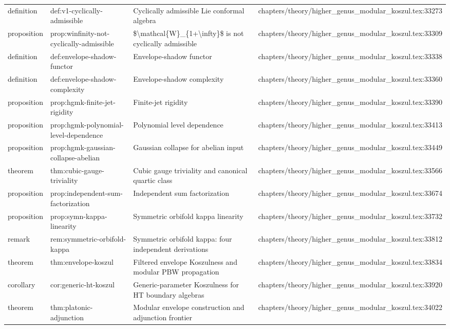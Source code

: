 \documentclass[11pt]{article}
\begin{document}
\begin{longtable}{L{0.10\textwidth}L{0.26\textwidth}L{0.42\textwidth}L{0.22\textwidth}}
definition & def:v1-cyclically-admissible & Cyclically admissible Lie conformal algebra & chapters/theory/higher\_genus\_modular\_koszul.tex:33273\\
proposition & prop:winfinity-not-cyclically-admissible & \$\textbackslash{}mathcal\{W\}\_\{1+\textbackslash{}infty\}\$ is not cyclically admissible & chapters/theory/higher\_genus\_modular\_koszul.tex:33309\\
definition & def:envelope-shadow-functor & Envelope-shadow functor & chapters/theory/higher\_genus\_modular\_koszul.tex:33338\\
definition & def:envelope-shadow-complexity & Envelope-shadow complexity & chapters/theory/higher\_genus\_modular\_koszul.tex:33360\\
proposition & prop:hgmk-finite-jet-rigidity & Finite-jet rigidity & chapters/theory/higher\_genus\_modular\_koszul.tex:33390\\
proposition & prop:hgmk-polynomial-level-dependence & Polynomial level dependence & chapters/theory/higher\_genus\_modular\_koszul.tex:33413\\
proposition & prop:hgmk-gaussian-collapse-abelian & Gaussian collapse for abelian input & chapters/theory/higher\_genus\_modular\_koszul.tex:33449\\
theorem & thm:cubic-gauge-triviality & Cubic gauge triviality and canonical quartic class & chapters/theory/higher\_genus\_modular\_koszul.tex:33566\\
proposition & prop:independent-sum-factorization & Independent sum factorization & chapters/theory/higher\_genus\_modular\_koszul.tex:33674\\
proposition & prop:symn-kappa-linearity & Symmetric orbifold kappa linearity & chapters/theory/higher\_genus\_modular\_koszul.tex:33732\\
remark & rem:symmetric-orbifold-kappa & Symmetric orbifold kappa: four independent derivations & chapters/theory/higher\_genus\_modular\_koszul.tex:33812\\
theorem & thm:envelope-koszul & Filtered envelope Koszulness and modular PBW propagation & chapters/theory/higher\_genus\_modular\_koszul.tex:33834\\
corollary & cor:generic-ht-koszul & Generic-parameter Koszulness for HT boundary algebras & chapters/theory/higher\_genus\_modular\_koszul.tex:33920\\
theorem & thm:platonic-adjunction & Modular envelope construction and adjunction frontier & chapters/theory/higher\_genus\_modular\_koszul.tex:34022\\

\end{longtable}
\end{document}
